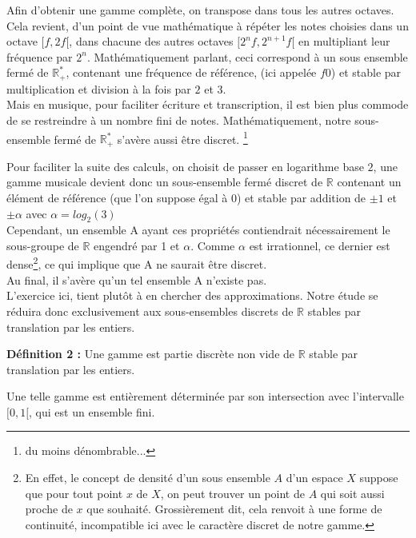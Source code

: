 \documentclass[moyen]{classeUPD}
\newenvironment{definition}{
	\begin{lrbox}{\tempbox}
		\begin{minipage}{\textwidth}
		}{
		\end{minipage}
	\end{lrbox}
	\begin{center}
		\fcolorbox[HTML]{222222}{EEEEEE}{
			\usebox{\tempbox}
		}
	\end{center}
}
\newcommand{\emf}[1]{\textbf{#1}}
\begin{document}
Afin d’obtenir une gamme complète, on transpose dans tous les autres octaves. Cela revient, d’un point de vue mathématique à répéter les notes choisies dans un octave $[f,2f[$, dans chacune des autres octaves $[2^{n}f,2^{n+1}f[$ en multipliant leur fréquence par $2^n$.
Mathématiquement parlant, ceci correspond à un sous ensemble fermé de $\mathbb{R}_{+}^{*}$, contenant une fréquence de référence, (ici appelée $f0$) et stable par multiplication et division à la fois par $2$ et $3$.\\
Mais en musique, pour faciliter écriture et transcription, il est bien plus commode de se restreindre à un nombre fini de notes. Mathématiquement, notre sous-ensemble fermé de $\mathbb{R}_{+}^{*}$  s’avère aussi être discret. \footnote{du moins dénombrable... }
\par Pour faciliter la suite des calculs, on choisit de passer en logarithme base $2$, une gamme musicale devient donc un sous-ensemble fermé discret de $\mathbb{R}$ contenant un élément de référence (que l'on suppose égal à 0) et stable par addition de $\pm1$ et $\pm \alpha$ avec $\alpha=log_{2}(3)$\\
Cependant, un ensemble A ayant ces propriétés contiendrait nécessairement le sous-groupe de $\mathbb{R}$ engendré par 1 et $\alpha$. Comme $\alpha$ est irrationnel, ce dernier est dense\footnote{En effet, le concept de densité d'un sous ensemble $A$ d'un espace $X$ suppose que pour tout point $x$ de $X$, on peut trouver un point de $A$ qui soit aussi proche de $x$ que souhaité. Grossièrement dit, cela renvoit à une forme de continuité, incompatible ici avec le caractère discret de notre gamme.}, ce qui implique que A ne saurait être discret.\\

Au final, il s’avère qu'un tel ensemble A n'existe pas.\\
L’exercice ici, tient plutôt à en chercher des approximations. Notre étude se réduira donc exclusivement aux sous-ensembles discrets de $\mathbb{R}$ stables par translation par les entiers.\
\clearpage

\begin{definition}
	\emf{Définition 2 :} Une gamme est partie discrète non vide de $\mathbb{R}$ stable par translation par les entiers.
\end{definition}
Une telle gamme est entièrement déterminée par son intersection avec l'intervalle $[0, 1[$, qui est un ensemble fini.
\end{document}

